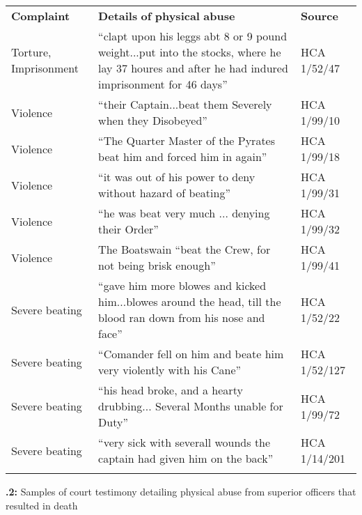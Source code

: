\begin{tabularx}{\textwidth}{XXX}
\lsptoprule

\textbf{Complaint} & \textbf{Details} \textbf{of} \textbf{physical} \textbf{abuse} & \textbf{Source}\\
Torture, Imprisonment & “clapt upon his leggs abt 8 or 9 pound weight...put into the stocks, where he lay 37 houres and after he had indured imprisonment for 46 days” & HCA 1/52/47\\
Violence & “their Captain...beat them Severely when they Disobeyed” & HCA 1/99/10\\
Violence & “The Quarter Master of the Pyrates beat him and forced him in again” & HCA 1/99/18\\
Violence & “it was out of his power to deny without hazard of beating” & HCA 1/99/31\\
Violence & “he was beat very much ... denying their Order” & HCA 1/99/32\\
Violence & The Boatswain “beat the Crew, for not being brisk enough” & HCA 1/99/41\\
Severe beating & “gave him more blowes and kicked him...blowes around the head, till the blood ran down from his nose and face” & HCA 1/52/22\\
Severe beating & “Comander fell on him and beate him very violently with his Cane” & HCA 1/52/127\\
Severe beating & “his head broke, and a hearty drubbing... Several Months unable for Duty” & HCA 1/99/72\\
Severe beating & “very sick with severall wounds the captain had given him on the back” & HCA 1/14/201\\
\lspbottomrule
\end{tabularx}
\textbf{.2:} Samples of court testimony detailing physical abuse from superior officers that resulted in death

